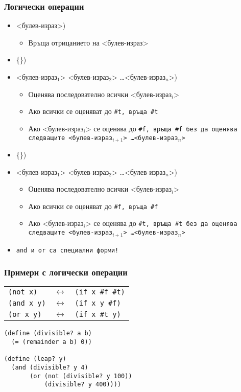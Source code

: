 \documentclass{beamer}
\begin{document}
\begin{frame}
  \frametitle{Логически операции}

  \begin{itemize}[<+->]
  \item {} <булев-израз>\tta)
    \begin{itemize}
    \item Връща отрицанието на <булев-израз>
    \end{itemize}
  \item {} \{<булев-израз>\}\tta)
  \item {} <булев-израз$_1$> <булев-израз$_2$> \ldots <булев-израз$_n$>\tta)
    \begin{itemize}
    \item Оценява последователно всички <булев-израз$_i$>
    \item Ако всички се оценяват до \tt{\#t}, връща \tt{\#t}
    \item Ако <булев-израз$_i$> се оценява до \tt{\#f}, връща
      \tt{\#f} без да оценява следващите <булев-израз$_{i+1}$> \ldots <булев-израз$_n$>
    \end{itemize}
  \item {} \{<булев-израз>\}\tta)
  \item {} <булев-израз$_1$> <булев-израз$_2$> \ldots <булев-израз$_n$>\tta)
    \begin{itemize}
    \item Оценява последователно всички <булев-израз$_i$>
    \item Ако всички се оценяват до \tt{\#f}, връща \tt{\#f}
    \item Ако <булев-израз$_i$> се оценява до \tt{\#t}, връща
      \tt{\#t} без да оценява следващите <булев-израз$_{i+1}$> \ldots <булев-израз$_n$>
    \end{itemize}
  \item \alert{\tt{and} и \tt{or} са специални форми!}
  \end{itemize}
\end{frame}

\begin{frame}[fragile]
  \frametitle{Примери с логически операции}

  \begin{tabular}{lcl}
    \lstinline!(not x)! &$\longleftrightarrow$& \lstinline!(if x #f #t)!\\
    \lstinline!(and x y)! &$\longleftrightarrow$& \lstinline!(if x y #f)!\\
    \lstinline!(or x y)! &$\longleftrightarrow$& \lstinline!(if x #t y)!
  \end{tabular}
\pause
\begin{lstlisting}
(define (divisible? a b)
  (= (remainder a b) 0))

(define (leap? y)
  (and (divisible? y 4)
       (or (not (divisible? y 100))
           (divisible? y 400))))
\end{lstlisting}
\end{frame}
\end{document}
